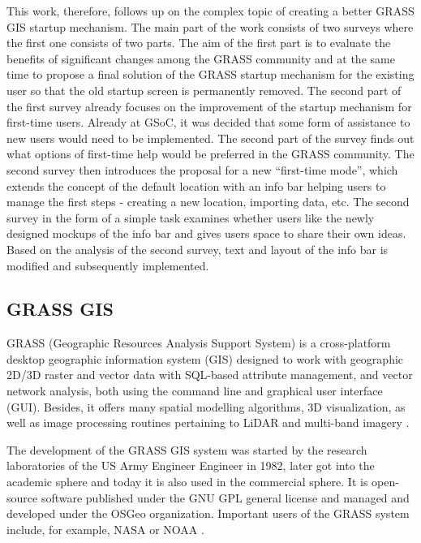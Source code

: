 \documentclass[a4paper,10pt,twoside]{article}
\begin{document}
This work, therefore, follows up on the complex topic of creating a better GRASS GIS startup mechanism. The main part of the work consists of two surveys where the first one consists of two parts. The aim of the first part is to evaluate the benefits of significant changes among the GRASS community and at the same time to propose a final solution of the GRASS startup mechanism for the existing user so that the old startup screen is permanently removed. The second part of the first survey already focuses on the improvement of the startup mechanism for first-time users. Already at GSoC, it was decided that some form of assistance to new users would need to be implemented. The second part of the survey finds out what options of first-time help would be preferred in the GRASS community. The second survey then introduces the proposal for a new ``first-time mode'', which extends the concept of the default location with an info bar helping users to manage the first steps - creating a new location, importing data, etc. The second survey in the form of a simple task examines whether users like the newly designed mockups of the info bar and gives users space to share their own ideas. Based on the analysis of the second survey, text and layout of the info bar is modified and subsequently implemented.

\newpage
\vspace*{-1cm}
\pagestyle{fancy}
\subsection{GRASS GIS}
\noindent GRASS (Geographic Resources Analysis Support System) is a cross-platform desktop geographic information system (GIS) designed to work with geographic 2D/3D raster and vector data with SQL-based attribute management, and vector network analysis, both using the command line and graphical user interface (GUI). Besides, it offers many spatial modelling algorithms, 3D visualization, as well as image processing routines pertaining to LiDAR and multi-band imagery \cite{NETELER2012124}.

The development of the GRASS GIS system was started by the research laboratories of the US Army Engineer Engineer in 1982, later got into the academic sphere and today it is also used in the commercial sphere. It is open-source software published under the GNU GPL general license and managed and developed under the OSGeo organization. Important users of the GRASS system include, for example, NASA or NOAA \cite{grassgis}.
\end{document}
